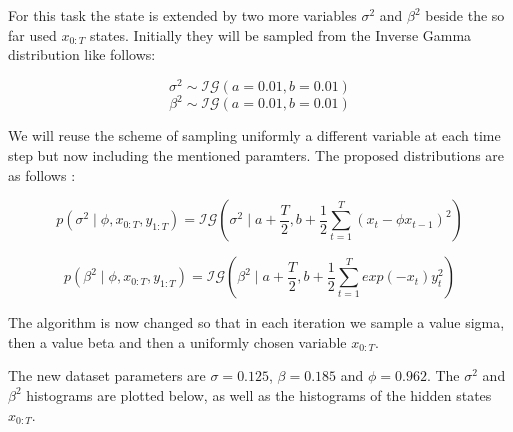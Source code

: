 \documentclass[]{article}
\begin{document}
For this task the state is extended by two more variables $\sigma^2$ and $\beta^2$ beside the so far used $x_{0:T}$ states. Initially they will be sampled from the Inverse Gamma distribution like follows:

$$ \sigma^2 \sim \mathcal{IG}(a = 0.01, b = 0.01)$$
$$ \beta^2 \sim \mathcal{IG}(a = 0.01, b = 0.01)$$


We will reuse the scheme of sampling uniformly a different variable at each time step but now including the mentioned paramters. The proposed distributions are as follows :

$$ p(\sigma^2 \mid \phi, x_{0:T}, y_{1:T} ) = \mathcal{IG} \left( \sigma^2 \mid a+\frac{T}{2}, b + \frac{1}{2} \sum_{t=1}^T (x_t - \phi x_{t-1})^2 \right) $$

$$ p(\beta^2 \mid \phi, x_{0:T}, y_{1:T} ) = \mathcal{IG} \left( \beta^2 \mid a+\frac{T}{2}, b + \frac{1}{2} \sum_{t=1}^T exp(-x_t)y_t^2 \right) $$

The algorithm is now changed so that in each iteration we sample a value sigma, then a value beta and then a uniformly chosen variable $x_{0:T}$. 

The new dataset parameters are $\sigma = 0.125$, $\beta = 0.185 $ and $\phi=0.962$. The $\sigma^2$ and $\beta^2$ histograms are plotted below, as well as the histograms of the hidden states $x_{0:T}$.
\end{document}
